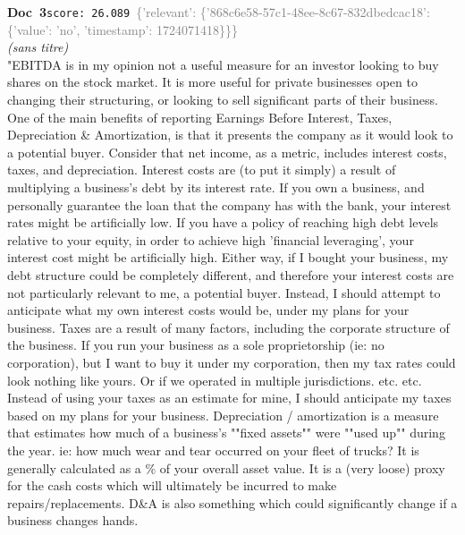 \documentclass[a4paper,11pt]{article}
\begin{document}
\begin{docenv}
{\footnotesize\textcolor{doccolor}{\textbf{Doc~3}}}\hfill{\tiny\texttt{score:~26.089}}\ {\tiny\textcolor{gray}{\{'relevant': \{'868c6e58-57c1-48ee-8c67-832dbedcac18': \{'value': 'no', 'timestamp': 1724071418\}\}\}}}\\[3pt]
{\small\textit{(sans titre)}}\\[2pt]
\vspace{2pt}
{\footnotesize 
"EBITDA is in my opinion not a useful measure for an investor looking to buy shares on the stock market. It is more useful for private businesses open to changing their structuring, or looking to sell significant parts of their business. One of the main benefits of reporting Earnings Before Interest, Taxes, Depreciation \& Amortization, is that it presents the company as it would look to a potential buyer. Consider that net income, as a metric, includes interest costs, taxes, and depreciation. Interest costs are (to put it simply) a result of multiplying a business's debt by its interest rate. If you own a business, and personally guarantee the loan that the company has with the bank, your interest rates might be artificially low. If you have a policy of reaching high debt levels relative to your equity, in order to achieve high 'financial leveraging', your interest cost might be artificially high. Either way, if I bought your business, my debt structure could be completely different, and therefore your interest costs are not particularly relevant to me, a potential buyer. Instead, I should attempt to anticipate what my own interest costs would be, under my plans for your business. Taxes are a result of many factors, including the corporate structure of the business. If you run your business as a sole proprietorship (ie: no corporation), but I want to buy it under my corporation, then my tax rates could look nothing like yours. Or if we operated in multiple jurisdictions. etc. etc. Instead of using your taxes as an estimate for mine, I should anticipate my taxes based on my plans for your business. Depreciation / amortization is a measure that estimates how much of a business's ""fixed assets"" were ""used up"" during the year. ie: how much wear and tear occurred on your fleet of trucks? It is generally calculated as a \% of your overall asset value. It is a (very loose) proxy for the cash costs which will ultimately be incurred to make repairs/replacements. D\&A is also something which could significantly change if a business changes hands.}
\end{docenv}
\end{document}
